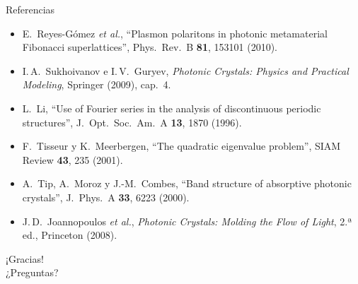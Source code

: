 \documentclass[aspectratio=169,10pt]{beamer}
\begin{document}
\begin{frame}{Referencias}
  \small
  \begin{itemize}
    \item E.~Reyes-Gómez \textit{et al.}, ``Plasmon polaritons in photonic metamaterial Fibonacci superlattices'',
      Phys.\ Rev.\ B \textbf{81}, 153101 (2010).
    \item I.\,A.~Sukhoivanov e I.\,V.~Guryev, \textit{Photonic Crystals: Physics and Practical Modeling},
      Springer (2009), cap.~4.
    \item L.~Li, ``Use of Fourier series in the analysis of discontinuous periodic structures'',
      J.\ Opt.\ Soc.\ Am.\ A \textbf{13}, 1870 (1996).
    \item F.~Tisseur y K.~Meerbergen, ``The quadratic eigenvalue problem'', SIAM Review \textbf{43}, 235 (2001).
    \item A.~Tip, A.~Moroz y J.-M.~Combes, ``Band structure of absorptive photonic crystals'',
      J.\ Phys.\ A \textbf{33}, 6223 (2000).
    \item J.\,D.~Joannopoulos \textit{et al.}, \textit{Photonic Crystals: Molding the Flow of Light}, 2.ª ed.,
      Princeton (2008).
  \end{itemize}
\end{frame}

\begin{frame}[standout]
  ¡Gracias!\\[0.5em]
  {\small ¿Preguntas?}
\end{frame}
\end{document}
